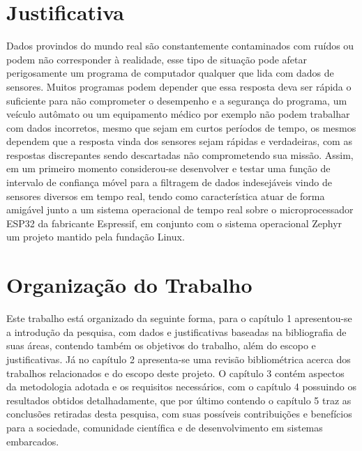 \section{Justificativa}
Dados provindos do mundo real são constantemente contaminados com ruídos ou podem não corresponder à realidade, esse tipo de situação pode afetar perigosamente um programa de computador qualquer que lida com dados de sensores. Muitos programas podem depender que essa resposta deva ser rápida o suficiente para não comprometer o desempenho e a segurança do programa, um veículo autômato ou um equipamento médico por exemplo não podem trabalhar com dados incorretos, mesmo que sejam em curtos períodos de tempo, os mesmos dependem que a resposta vinda dos sensores sejam rápidas e verdadeiras, com as respostas discrepantes sendo descartadas não comprometendo sua missão. 
Assim, em um primeiro momento considerou-se desenvolver e testar uma função de intervalo de confiança móvel para a filtragem de dados indesejáveis vindo de sensores diversos em tempo real, tendo como característica atuar de forma amigável junto a um sistema operacional de tempo real sobre o microprocessador ESP32 da fabricante Espressif, em conjunto com o sistema operacional Zephyr um projeto mantido pela fundação Linux.


\section{Organização do Trabalho}
Este trabalho está organizado da seguinte forma, para o capítulo 1 apresentou-se a introdução da pesquisa, com dados e justificativas baseadas na bibliografia de suas áreas, contendo também os objetivos do trabalho, além do escopo e justificativas. Já no capítulo 2 apresenta-se uma revisão bibliométrica acerca dos trabalhos relacionados e do escopo deste projeto. O capítulo 3 contém aspectos da metodologia adotada e os requisitos necessários, com o  capítulo 4 
possuindo os resultados obtidos detalhadamente, que por último contendo o capítulo 5 traz as conclusões retiradas desta pesquisa, com suas possíveis contribuições e benefícios para a sociedade, comunidade científica e de desenvolvimento em sistemas embarcados.
 

